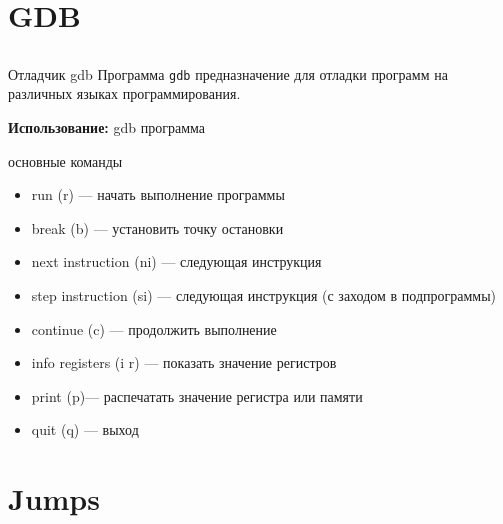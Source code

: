 \documentclass[utf8, russian]{beamer}
\begin{document}
    \section{GDB}
    \subsection{}
    \begin{frame}{Отладчик gdb}
    Программа {\tt gdb} предназначение для отладки программ на различных языках программирования.

    {\bf Использование:} gdb программа
    \begin{block}{основные команды}
        \begin{itemize}
            \item run (r) --- начать выполнение программы
            \item break (b) --- установить точку остановки
            \item next instruction (ni) --- следующая инструкция
            \item step instruction (si) --- следующая инструкция (с заходом в подпрограммы)
            \item continue (c) --- продолжить выполнение
            \item info registers (i r) --- показать значение регистров
            \item print (p)--- распечатать значение регистра или памяти
            \item quit (q) --- выход
        \end{itemize}
    \end{block}
    \end{frame}
    \section{Jumps}
\end{document}
